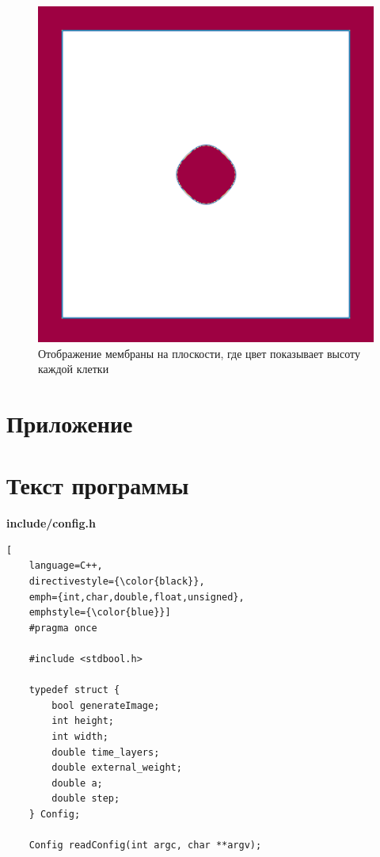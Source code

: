 \begin{figure}[H]
    \centering
    \includegraphics[width=\linewidth]{images/output2.png}
    \caption{Отображение мембраны на плоскости, где цвет показывает высоту каждой клетки}
    \label{fig:dsp}
\end{figure}

\newpage

\appendix

\section*{Приложение}
\section*{Текст программы}

\textbf{include/config.h}

\begin{lstlisting}[
    language=C++,
    directivestyle={\color{black}}, 
    emph={int,char,double,float,unsigned}, 
    emphstyle={\color{blue}}]
    #pragma once

    #include <stdbool.h>
    
    typedef struct {
        bool generateImage;
        int height;
        int width;
        double time_layers;
        double external_weight;
        double a;
        double step;
    } Config;
    
    Config readConfig(int argc, char **argv);
\end{lstlisting}

